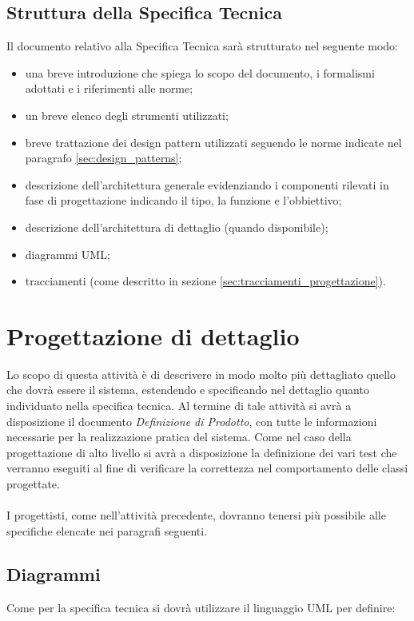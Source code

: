 {\subsection{Struttura della Specifica Tecnica}
Il documento relativo alla Specifica Tecnica sarà strutturato nel seguente modo:
\begin{itemize}
\item una breve introduzione che spiega lo scopo del documento, i formalismi adottati e i riferimenti alle norme;
\item un breve elenco degli strumenti utilizzati;
\item breve trattazione dei design pattern utilizzati seguendo le norme indicate nel paragrafo \ref{sec:design_patterns};
\item descrizione dell'architettura generale evidenziando i componenti rilevati in fase di progettazione indicando il tipo, la funzione e l'obbiettivo;
\item descrizione dell'architettura di dettaglio (quando disponibile);
\item diagrammi UML;
\item tracciamenti (come descritto in sezione \ref{sec:tracciamenti_progettazione}).
\end{itemize}

\section{Progettazione di dettaglio}
Lo scopo di questa attività è di descrivere in modo molto più dettagliato quello che dovrà essere il sistema, estendendo e specificando nel dettaglio quanto individuato nella specifica tecnica.
Al termine di tale attività si avrà a disposizione il documento \textit{Definizione di Prodotto}, con tutte le informazioni necessarie per la realizzazione pratica del sistema.
Come nel caso della progettazione di alto livello si avrà a disposizione la definizione dei vari test che verranno eseguiti al fine di verificare la correttezza nel comportamento delle classi progettate.\\\\
I progettisti, come nell'attività precedente, dovranno tenersi più possibile alle specifiche elencate nei paragrafi seguenti.

\subsection{Diagrammi}
Come per la specifica tecnica si dovrà utilizzare il linguaggio UML per definire:

}
